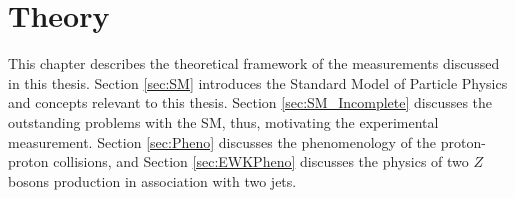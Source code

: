 \part{Theory}
\label{sec:theory}

This chapter describes the theoretical framework of the measurements discussed in this thesis. Section  \ref{sec:SM} introduces the Standard Model of Particle Physics and concepts relevant to this thesis. Section \ref{sec:SM_Incomplete} discusses the outstanding problems with the SM, thus, motivating the experimental measurement. Section \ref{sec:Pheno} discusses the phenomenology of the proton-proton collisions, and Section \ref{sec:EWKPheno} discusses the physics of two $Z$ bosons production in association with two jets. 